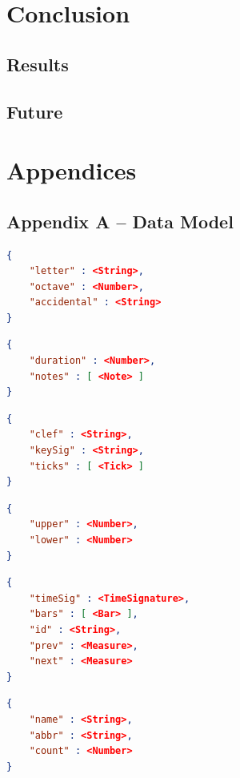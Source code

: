 \documentclass[letterpaper,12pt]{article}
\begin{document}
\section{Conclusion}

\subsection{Results}

\subsection{Future}

\newpage

\section{Appendices}

\subsection{Appendix A -- Data Model}

\begin{lstlisting}[language=json, caption=Note]
{
    "letter" : <String>,
    "octave" : <Number>,
    "accidental" : <String>
}
\end{lstlisting}

\begin{lstlisting}[language=json, caption=Tick]
{
    "duration" : <Number>,
    "notes" : [ <Note> ]
}
\end{lstlisting}

\begin{lstlisting}[language=json, caption=Bar]
{
    "clef" : <String>,
    "keySig" : <String>,
    "ticks" : [ <Tick> ]
}
\end{lstlisting}

\begin{lstlisting}[language=json, caption=TimeSignature]
{
    "upper" : <Number>,
    "lower" : <Number>
}
\end{lstlisting}

\begin{lstlisting}[language=json, caption=Measure]
{
    "timeSig" : <TimeSignature>,
    "bars" : [ <Bar> ],
    "id" : <String>,
    "prev" : <Measure>,
    "next" : <Measure>
}
\end{lstlisting}

\begin{lstlisting}[language=json, caption=Group]
{
    "name" : <String>,
    "abbr" : <String>,
    "count" : <Number>
}
\end{lstlisting}
\end{document}
